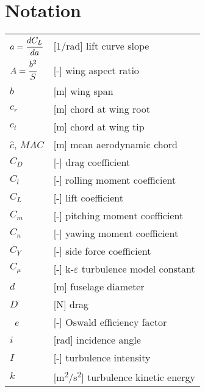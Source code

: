 \clearpage %
{}
\chapter*{Notation}
\markright{}

\begin{longtable}[l]{ l p{} }
  $a=\cfrac{dC_L}{da}$                         & [1/rad] lift curve slope \\
  $A=\cfrac{b^2}{S}$                           & [-] wing aspect ratio \\
  $b$                                          & [m] wing span \\
  $c_r$                                        & [m] chord at wing root \\
  $c_t$                                        & [m] chord at wing tip \\
  $\hat c$, $MAC$                              & [m] mean aerodynamic chord \\
  $C_D$                                        & [-] drag coefficient \\
  $C_l$                                        & [-] rolling moment coefficient \\
  $C_L$                                        & [-] lift coefficient \\
  $C_m$                                        & [-] pitching moment coefficient \\
  $C_n$                                        & [-] yawing moment coefficient \\
  $C_Y$                                        & [-] side force coefficient \\
  $C_{\mu}$                                    & [-] k-$\varepsilon$ turbulence model constant \\
  $d$                                          & [m] fuselage diameter \\
  $D$                                          & [N] drag \\\
  $e$                                          & [-] Oswald efficiency factor \\
  $i$                                          & [rad] incidence angle \\
  $I$                                          & [-] turbulence intensity \\
  $k$                                          & [m\textsuperscript{2}/s\textsuperscript{2}] turbulence kinetic energy \\

\end{longtable}
